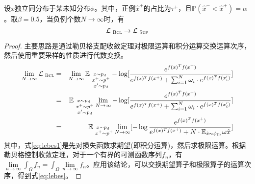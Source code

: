\begin{theorem}[渐进一致估计]
设$\hat{x}$独立同分布于某未知分布$\phi$。其中，正例$\hat x^+$的占比为$\tau^+$，且$\mathbb P (\hat x^- < \hat x^+)= \alpha$ 。取$\beta = 0.5$，当负例个数$N\rightarrow \infty$时，有
\[ \mathcal{L}_\textsc{~Bcl}\rightarrow\mathcal{L}_\textsc{~Sup} \]

\begin{proof}
主要思路是通过勒贝格支配收敛定理对极限运算和积分运算交换运算次序，然后使用重要采样的性质进行代数变换。
\begin{eqnarray}
	\lim_{N\rightarrow \infty} \mathcal{L}_\textsc{~Bcl} &=& \lim_{N\rightarrow \infty}   \mathbb E_{\substack{x \sim p_d\\~x^+ \sim p^+\\~x^\prime \sim p_d}} -\log[ \frac{e^{f(x)^Tf(x^+)}}{e^{f(x)^Tf(x^+)} +  \sum_{i=1}^N  \omega_i\cdot e^{f(x)^Tf(x^\prime_i)} }]  \label{eq:lebes1}\\ 
	&=&   \mathbb E_{\substack{x \sim p_d\\~x^+ \sim p^+\\~x^\prime \sim p_d}} \lim_{N\rightarrow \infty} -\log[ \frac{e^{f(x)^Tf(x^+)}}{e^{f(x)^Tf(x^+)} +  \sum_{i=1}^N  \omega_i\cdot e^{f(x)^Tf(x^\prime_i)} }]  \label{eq:lebes}\\ 
	&=& \mathbb E_{\substack{x \sim p_d\\~x^+ \sim p^+} }	\lim_{N\rightarrow \infty}[-\log \frac{e^{f(x)^Tf(x^+)}}{e^{f(x)^Tf(x^+)} + N\cdot \mathbb{E}_{\hat{x} \sim \phi_{\textsc{Un}} } \omega\hat x  }] \label{eq:bcldenomitor}
\end{eqnarray}
其中，式\eqref{eq:lebes1}是先对损失函数求期望(即积分运算)，然后求极限运算。根据勒贝格控制收敛定理，对于一个有界的可测函数序列$f_n$，有$\lim\limits_{n\rightarrow \infty} \int_{\Omega} f_n =\int_{\Omega} \lim\limits_{n\rightarrow\infty}f_n $。应用该结论，可以交换期望算子和极限算子的运算次序，得到式\eqref{eq:lebes}。


\end{proof}
\end{theorem}
